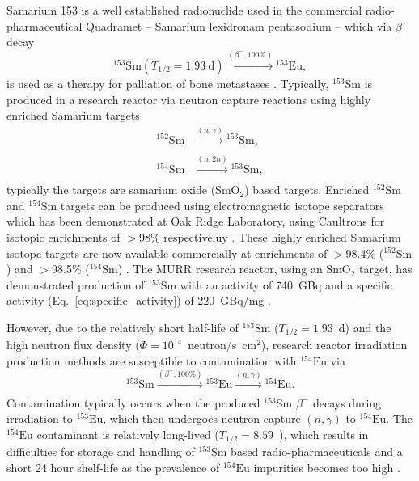 \documentclass[../main.tex]{subfiles}
\begin{document}
Samarium 153 is a well established radionuclide used in the commercial radio-pharmaceutical Quadramet \cite{ema2015quadramet} -- Samarium lexidronam pentasodium -- which via $\beta^{-}$ decay 
\begin{equation}
^{153}\mathrm{Sm} \left(T_{1/2} = 1.93~\mathrm{\si{\day}}\right)\xrightarrow[]{\left(\beta^{-},\mathrm{100\%}\right)} {}^{153}\mathrm{Eu},
\label{eq:153Sm_beta_minus_decay}    
\end{equation}
is used as a therapy for palliation of bone metastases \cite{kapoor2021cancer,murray2021systemic}. Typically, $^{153}\mathrm{Sm}$ is produced in a research reactor via neutron capture reactions using highly enriched Samarium targets 
\begin{align}
^{152}\mathrm{Sm}&\xrightarrow[]{\left(n,\gamma\right)}{}^{153}\mathrm{Sm}, \\
^{154}\mathrm{Sm}&\xrightarrow[]{\left(n,2n\right)}{}^{153}\mathrm{Sm},
\label{eq:153Sm_research_reactor_production}
\end{align}
typically the targets are samarium oxide ($\mathrm{SmO}_{2}$) based targets. Enriched $^{152}\mathrm{Sm}$ and $^{154}\mathrm{Sm}$ targets can be produced using electromagnetic isotope separators which has been demonstrated at Oak Ridge Laboratory, using Caultrons for isotopic enrichments of $>$98\% respectiveluy \cite{bell1987stable}. These highly enriched Samarium isotope targets are now available commercially at enrichments of $>$98.4\% ($^{152}\mathrm{Sm}$) and $>$98.5\% ($^{154}\mathrm{Sm}$) \cite{isoflex2021sm}. The MURR research reactor, using an $\mathrm{SmO}_{2}$ target, has demonstrated production of $^{153}\mathrm{Sm}$ with an activity of 740~\si{\giga\becquerel} and a specific activity (Eq.~\ref{eq:specific_activity}) of 220~\si{\giga\becquerel}/\si{\milli\gram} \cite{ma1996production}.

However, due to the relatively short half-life of $^{153}\mathrm{Sm}$ ($T_{1/2} = 1.93$~\si{\day}) and the high neutron flux density ($\Phi=10^{14}$~neutron/\si{\second\centi\meter}$^{2}$), research reactor irradiation production methods are susceptible to contamination with $^{154}\mathrm{Eu}$ \cite{naseri2021effective,van2018separation} via
\begin{equation}
^{153}\mathrm{Sm}\xrightarrow[]{\left(\beta^{-},\mathrm{100\%}\right)}{}^{153}\mathrm{Eu}\xrightarrow[]{\left(n,\gamma\right)}{}^{154}\mathrm{Eu}.
\label{eq:153Sm_reactor_contamination}    
\end{equation}
Contamination typically occurs when the produced $^{153}\mathrm{Sm}$ $\beta^{-}$ decays during irradiation to $^{153}\mathrm{Eu}$, which then undergoes neutron capture $\left(n,\gamma\right)$ to $^{154}\mathrm{Eu}$. The $^{154}\mathrm{Eu}$ contaminant is relatively long-lived ($T_{1/2} = 8.59$~), which results in difficulties for storage and handling of $^{153}\mathrm{Sm}$ based radio-pharmaceuticals and a short 24 hour shelf-life \cite{ema2015quadramet} as the prevalence of $^{154}\mathrm{Eu}$ impurities becomes too high \cite{van2018separation}.
\end{document}
